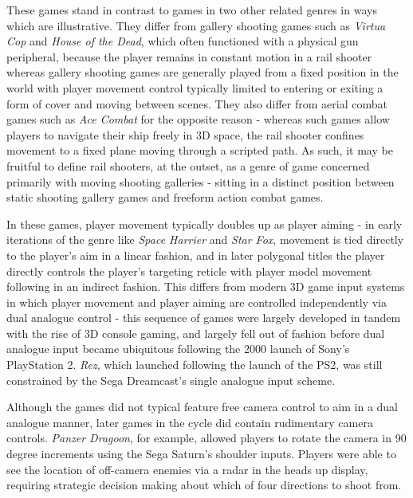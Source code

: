 \documentclass[11pt]{article}
\begin{document}
These games stand in contrast to games in two other related genres in ways which are illustrative.
They differ from gallery shooting games such as \textit{Virtua Cop} and \textit{House of the Dead}, which
often functioned with a physical gun peripheral, because the player remains in constant motion in
a rail shooter whereas gallery shooting games are generally played from a fixed position in the world
with player movement control typically limited to entering or exiting a form of cover and moving
between scenes. They also differ from aerial combat games such as \textit{Ace Combat} for the opposite
reason - whereas such games allow players to navigate their ship freely in 3D space, the rail shooter
confines movement to a fixed plane moving through a scripted path. As such, it may be fruitful to
define rail shooters, at the outset, as a genre of game concerned primarily with moving shooting galleries -
sitting in a distinct position between static shooting gallery games and freeform action combat games.

In these games, player movement typically doubles up as player aiming - in early iterations of the genre like
\textit{Space Harrier} and \textit{Star Fox}, movement is tied directly to the player's aim in a
linear fashion, and in later polygonal titles the player directly controls the player's targeting
reticle with player model movement following in an indirect fashion. This differs from modern 3D
game input systems in which player movement and player aiming are controlled independently via dual 
analogue control - this sequence of games were largely developed in tandem with the rise of 3D console
gaming, and largely fell out of fashion before dual analogue input became ubiquitous following the
2000 launch of Sony's PlayStation 2. \textit{Rez}, which launched following the launch of the PS2,
was still constrained by the Sega Dreamcast's single analogue input scheme.


Although the games did not typical feature free camera control to aim in a dual analogue manner,
later games in the cycle did contain rudimentary camera controls. \textit{Panzer Dragoon}, for example,
allowed players to rotate the camera in 90 degree increments using the Sega Saturn's shoulder inputs.
Players were able to see the location of off-camera enemies via a radar in the heads up
display, requiring strategic decision making about which of four directions to shoot from.
\end{document}
